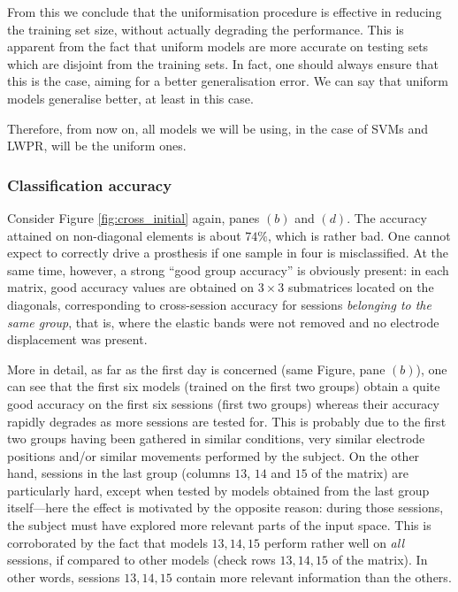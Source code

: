 From this we conclude that the uniformisation procedure is effective
in reducing the training set size, without actually degrading the
performance. This is apparent from the fact that uniform models are
more accurate on testing sets which are disjoint from the training
sets. In fact, one should always ensure that this is the case, aiming
for a better generalisation error. We can say that uniform models
generalise better, at least in this case.

Therefore, from now on, all models we will be using, in the case of
SVMs and LWPR, will be the uniform ones.

\subsubsection{Classification accuracy}

Consider Figure \ref{fig:cross_initial} again, panes $(b)$ and
$(d)$. The accuracy attained on non-diagonal elements is about
$74\%$, which is rather bad. One cannot expect to correctly drive
a prosthesis if one sample in four is misclassified. At the same
time, however, a strong ``good group accuracy'' is obviously
present: in each matrix, good accuracy values are obtained on
$3\times3$ submatrices located on the diagonals, corresponding to
cross-session accuracy for sessions \emph{belonging to the same
group}, that is, where the elastic bands were not removed and no
electrode displacement was present.

More in detail, as far as the first day is concerned (same Figure,
pane $(b)$), one can see that the first six models (trained on the
first two groups) obtain a quite good accuracy on the first six
sessions (first two groups) whereas their accuracy rapidly degrades as
more sessions are tested for. This is probably due to the first two
groups having been gathered in similar conditions, very similar
electrode positions and/or similar movements performed by the
subject. On the other hand, sessions in the last group (columns $13$,
$14$ and $15$ of the matrix) are particularly hard, except when tested
by models obtained from the last group itself---here the effect is
motivated by the opposite reason: during those sessions, the subject
must have explored more relevant parts of the input space. This is
corroborated by the fact that models $13,14,15$ perform rather well on
\emph{all} sessions, if compared to other models (check rows
$13,14,15$ of the matrix). In other words, sessions $13,14,15$ contain
more relevant information than the others.


